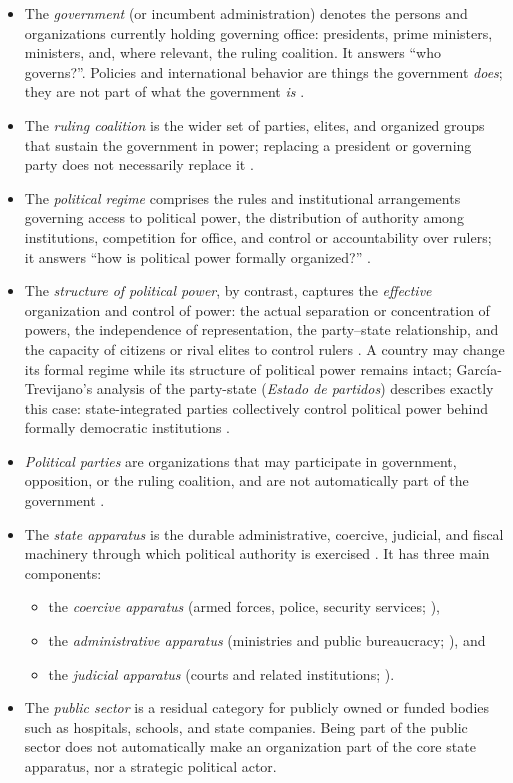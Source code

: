 \documentclass[11pt]{article}
\begin{document}
\begin{itemize}
	\item The \emph{government} (or incumbent administration) denotes the persons and organizations currently holding governing office: presidents, prime ministers, ministers, and, where relevant, the ruling coalition. It answers ``who governs?''. Policies and international behavior are things the government \emph{does}; they are not part of what the government \emph{is} \parencite{linz_stepan_1996}.
	\item The \emph{ruling coalition} is the wider set of parties, elites, and organized groups that sustain the government in power; replacing a president or governing party does not necessarily replace it \parencite{bueno_de_mesquita_2003}.
	\item The \emph{political regime} comprises the rules and institutional arrangements governing access to political power, the distribution of authority among institutions, competition for office, and control or accountability over rulers; it answers ``how is political power formally organized?'' \parencite{linz_stepan_1996,linz_2000}.
	\item The \emph{structure of political power}, by contrast, captures the \emph{effective} organization and control of power: the actual separation or concentration of powers, the independence of representation, the party--state relationship, and the capacity of citizens or rival elites to control rulers \parencite{garciatrevijano2010}. A country may change its formal regime while its structure of political power remains intact; Garc{\'i}a-Trevijano's analysis of the party-state (\emph{Estado de partidos}) describes exactly this case: state-integrated parties collectively control political power behind formally democratic institutions \parencite{garciatrevijano2010}.
	\item \emph{Political parties} are organizations that may participate in government, opposition, or the ruling coalition, and are not automatically part of the government \parencite{sartori_1976}.
	\item The \emph{state apparatus} is the durable administrative, coercive, judicial, and fiscal machinery through which political authority is exercised \parencite{weber1922wirtschaft,althusser_1971}. It has three main components:
	\begin{itemize}
		\item the \emph{coercive apparatus} (armed forces, police, security services; \textcite{tilly_1990,althusser_1971}),
		\item the \emph{administrative apparatus} (ministries and public bureaucracy; \textcite{weber1922wirtschaft}), and
		\item the \emph{judicial apparatus} (courts and related institutions; \textcite{weber1922wirtschaft,garciatrevijano2010}).
	\end{itemize}
	\item The \emph{public sector} is a residual category for publicly owned or funded bodies such as hospitals, schools, and state companies. Being part of the public sector does not automatically make an organization part of the core state apparatus, nor a strategic political actor.
\end{itemize}
\end{document}
